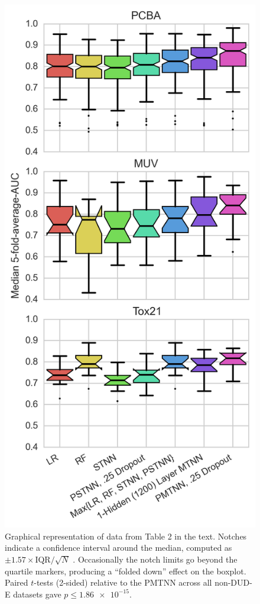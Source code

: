 \begin{figure}[ht]
\centering
\includegraphics[height=0.9\textheight]{Images/table2boxplot.png}
\caption{Graphical representation of data from Table 2 in the text. Notches
  indicate a confidence interval around the median, computed as $\pm 1.57
  \times \text{IQR}/ \sqrt{N}$ \citep{mcgill1978variations}. Occasionally the
  notch limits go beyond the quartile markers, producing a ``folded down''
  effect on the boxplot. Paired $t$-tests (2-sided) relative to the PMTNN
  across all non-DUD-E datasets gave $p \le \num{1.86e-15}$.}
\label{fig:table2boxplot}
\end{figure}


